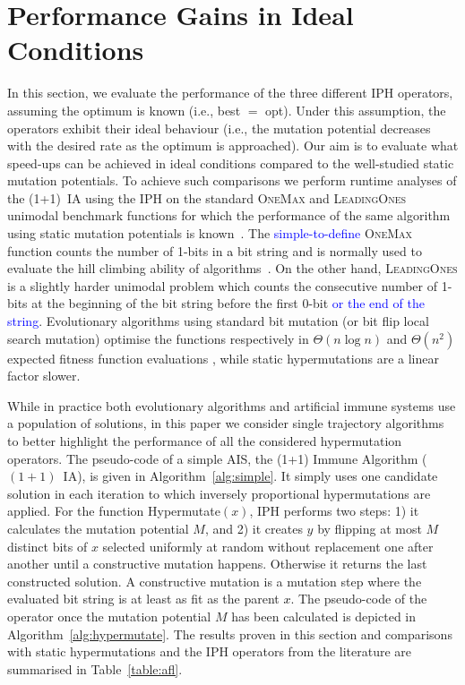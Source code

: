 \documentclass[lettersize,journal]{IEEEtran}
\newcommand{\new}[1]{\textcolor{black}{#1}}
\newcommand{\rev}[1]{\textcolor{blue}{#1}}
\newcommand{\oneoneIA}{$(1+1)$~IA}
\newcommand{\IPHfcm}{IPH}
\begin{document}
 	
\section{Performance Gains in Ideal Conditions}\label{sec:OptKnown} 






In this section, we evaluate the performance of the three different \IPHfcm{} operators, assuming the optimum is known (i.e., best $=$ opt). Under this assumption, the operators exhibit their ideal behaviour (i.e., the mutation potential decreases with the desired rate as the optimum is approached).
Our aim is to evaluate what speed-ups can be achieved in ideal conditions compared to the well-studied static mutation potentials. To achieve such comparisons we perform runtime analyses of the (1+1)~IA  using the \IPHfcm{} on the standard \textsc{OneMax} and \textsc{LeadingOnes} unimodal benchmark functions for which the performance of the same algorithm using static mutation potentials is known~\cite{CorusOlivetoYazdani2019TCS}. The \rev{simple-to-define} \textsc{OneMax} function counts the number of 1-bits in \new{a} bit string and is normally used to evaluate the hill climbing ability of algorithms~\cite{LehrTEVC2018,CorusOlivetoTEVCsteadyGA2017,CorusOlivetoAlgo2020,DoerrDoerrEbel2015}. On the other hand, \textsc{LeadingOnes} is a slightly harder unimodal problem which counts the consecutive number of 1-bits at the beginning of the bit string before the first 0-bit \rev{or the end of the string}. 
Evolutionary algorithms using standard bit mutation (or bit flip local search mutation) optimise the functions respectively in $\Theta(n \log n)$ and $\Theta(n^2)$ expected fitness function evaluations \cite{DrosteJansenWegener2002,BoettcherEtAl2010,DoerrEtAl2016B,LissovoiOlivetoWarwicker2020,DLOW2018}, while static hypermutations are a linear factor slower\cite{CorusOlivetoYazdani2019TCS}.

While in practice both evolutionary algorithms and artificial immune systems use a population of solutions, in this paper we consider single trajectory algorithms to better highlight the performance of all the considered hypermutation operators.
The pseudo-code of a simple AIS,  the (1+1) Immune Algorithm (\oneoneIA{}), is given in Algorithm~\ref{alg:simple}. It simply uses one candidate solution in each iteration to which inversely proportional hypermutations are applied. For the function Hypermutate$(x)$, \IPHfcm{} performs two steps: 
1) it calculates the mutation potential $M$, and 2) it creates $y$ by flipping at most $M$ distinct bits of $x$ selected uniformly at random without replacement one after another until a constructive mutation happens. Otherwise it returns the last constructed solution. A  constructive mutation is a mutation step where the evaluated bit string is at least as fit as the parent \new{$x$}. The pseudo-code of the operator once the mutation potential $M$ has been calculated is depicted in Algorithm~\ref{alg:hypermutate}.
The results proven in this section and comparisons with static hypermutations and the IPH operators from the literature are summarised in Table~\ref{table:afl}.
\end{document}
